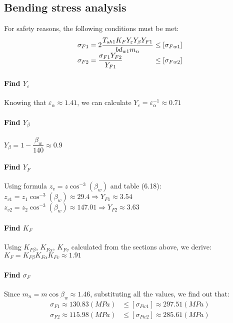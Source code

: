 \subsection{Bending stress analysis}
For safety reasons, the following conditions must be met:
\[
\begin{array}{l@{{} \leq {}}l}
	\sigma_{F1} = 2\dfrac{T_{sh1}K_FY_\varepsilon Y_\beta Y_{F1}}{bd_{w1}m_n} & [\sigma_{Fw1}]\\ 
	\sigma_{F2} = \dfrac{\sigma_{F1}Y_{F2}}{Y_{F1}} & [\sigma_{Fw2}]
\end{array}
\]

\paragraph{Find $ Y_\varepsilon $} Knowing that $ \varepsilon_\alpha \approx 1.41 $, we can calculate $ Y_\varepsilon = \varepsilon_\alpha^{-1} \approx 0.71 $
\paragraph{Find $ Y_\beta $} $ Y_\beta = 1-\dfrac{\beta_w}{140}\approx0.9$
\paragraph{Find $ Y_F $} Using formula $ z_v = z\cos^{-3}(\beta_w) $ and table (6.18):\\
$ z_{v1} = z_1\cos^{-3}(\beta_w) \approx 29.4 \Rightarrow Y_{F1} \approx 3.54$\\
$ z_{v2} = z_2\cos^{-3}(\beta_w) \approx 147.01 \Rightarrow Y_{F2} \approx 3.63 $
\paragraph{Find $ K_F $}
Using $ K_{F\beta} $, $ K_{F\alpha} $, $ K_{Fv} $ calculated from the sections above, we derive:\\ $ K_F = K_{F\beta}K_{F\alpha}K_{Fv} \approx 1.91 $

\paragraph{Find $ \sigma_F $} Since $ m_n = m\cos\beta_w \approx 1.46$, substituting all the values, we find out that:
\begin{align*}
	\sigma_{F1} \approx 130.83 \unit{(MPa)} & \leq [\sigma_{Fw1}]\approx 297.51 \unit{(MPa)}\\
	\sigma_{F2} \approx 115.98 \unit{(MPa)} & \leq [\sigma_{Fw2}]\approx 285.61 \unit{(MPa)}
\end{align*}

